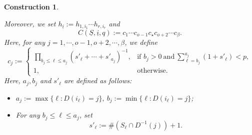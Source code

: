 \documentclass[12pt, a4paper]{article}
\newtheorem{construction}{Construction}[section]
\begin{document}
\begin{construction}
\begin{itemize}

\iffalse
Moreover, we set $h_{\underline i}:=h_{1,i_1}\cdots h_{r,i_r}$ and
$$
 C(\underline S,\underline i,q):=c_1\cdots c_{o-1}c_\star c_{o+2}\cdots c_\beta.
$$
Here, for any $j=1,\cdots,o-1,o+2,\cdots,\beta$, we define
   \[
c_j := 
\begin{cases}
\prod_{b_j \leq\ell \leq a_j}(s'_\ell+ \cdots + s'_{a_j}) ^{-1}, & \text{if } b_j > 0~\mathrm{and}~\sum_{\ell=b_j}^{a_j}(1+s'_\ell)<p, \\
1, & \text{otherwise}.
\end{cases}
\]  
Here, $a_j,b_j$ and $s'_\ell$ are defined as follows:
\begin{itemize}
    \item $a_j := \max \{ \ell : D(i_\ell) = j \}  ,~ 
b_j := \min \{ \ell : D(i_\ell) = j\}$;
\item For any $b_j\leq\ell\leq a_j$, set 
$$
s'_\ell := \# ( S_\ell \cap D^{-1}(j))+1.
$$
\end{itemize}




\end{itemize}
\end{construction}
\end{document}
